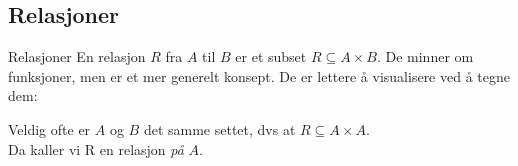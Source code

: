 \subsection{Relasjoner}
\begin{frame}[fragile]{Relasjoner}
    En relasjon $R$ fra $A$ til $B$ er et subset $ R \subseteq A \times B$. De minner om funksjoner, men er et mer generelt konsept. De er lettere å visualisere ved å tegne dem:
    \begin{figure}
        \centering
        \qquad
        \qquad
        \qquad
        \label{fig:relasjoner}
    \end{figure} 

    \pause
    Veldig ofte er $A$ og $B$ det samme settet, dvs at $R \subseteq A \times A$.\\ 
    Da kaller vi R en relasjon \emph{på} $A$.
\end{frame}

